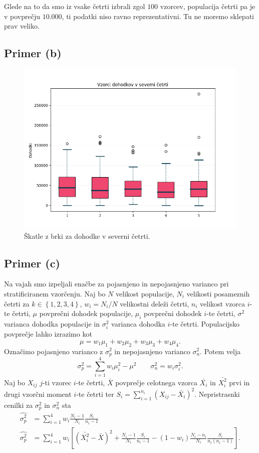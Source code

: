 \documentclass[a4paper,11pt]{article}
\newcommand{\set}[1]{\left\{#1\right\}} %
\begin{document}
Glede na to da smo iz vsake četrti izbrali zgol $100$ vzorcev, populacija četrti pa je v povprečju $10.000$, ti podatki niso ravno reprezentativni.
Tu ne moremo sklepati prav veliko.

\subsection*{Primer (b)}

\begin{figure}[H]
    \centering
    \includegraphics[scale=0.7]{Skatle_z_brki_Sever.png}
    \caption{Škatle z brki za dohodke v severni četrti.}
\end{figure}

\subsection*{Primer (c)}

Na vajah smo izpeljali enačbe za pojasnjeno in nepojasnjeno varianco pri stratificiranem vzorčenju.
Naj bo $N$ velikost populacije, $N_i$ velikosti posameznih četrti za $k \in \set{1,2,3,4}$, $w_i = N_i/N$ velikostni deleži četrti, $n_i$ velikost vzorca $i$-te četrti,
$\mu$ povprečni dohodek populacije, $\mu_i$ povprečni dohodek $i$-te četrti, $\sigma^2$ varianca dohodka populacije in $\sigma_i^2$ varianca dohodka $i$-te četrti.
Populacijsko povprečje lahko izrazimo kot
\[\mu = w_1 \mu_1 + w_2 \mu_2 + w_3 \mu_3 + w_4 \mu_4.\]
Označimo pojasnjeno varianco z $\sigma^2_p$ in nepojasnjeno varianco $\sigma^2_n$.
Potem velja
\[\sigma^2_p = \sum_{i=1}^4 w_i \mu_i^2 - \mu^2 \qquad \sigma^2_n = w_i \sigma_i^2.\]
Naj bo $X_{ij}$ $j$-ti vzorec $i$-te četrti, $\bar{X}$ povprečje celotnega vzorca $\bar{X_i}$ in $\bar{X_i^2}$ prvi in drugi vzorčni moment $i$-te četrti ter $S_i = \sum_{i=1}^{n_i} (X_{ij} - \bar{X_i})^2$.
Nepristrasnki cenilki za $\sigma^2_p$ in $\sigma^2_n$ sta
\begin{align*}
    \hat{\sigma^2_p} &= \sum_{i=1}^4 w_i \frac{N_i-1}{N_i} \frac{S_i}{n_i-1} \\
    \hat{\sigma^2_p} &= \sum_{i=1}^4 w_i \left[ (\bar{X_i^2} - \bar{X})^2 + \frac{N_i-1}{N_i} \frac{S_i}{n_i - 1} - (1-w_i) \frac{N_i - n_i}{N_i} \frac{S_i}{n_i(n_i-1)} \right].
\end{align*}
\end{document}
